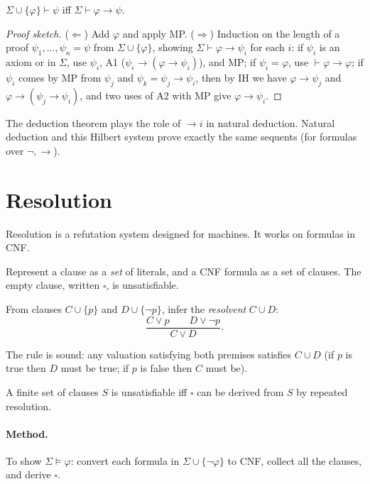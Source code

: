 \begin{theorem}
$\Sigma\cup\{\varphi\}\vdash\psi$ iff $\Sigma\vdash\varphi\to\psi$.
\end{theorem}
\begin{proof}[Proof sketch]
($\Leftarrow$) Add $\varphi$ and apply MP. ($\Rightarrow$) Induction on the length of a
proof $\psi_1,\dots,\psi_n=\psi$ from $\Sigma\cup\{\varphi\}$, showing
$\Sigma\vdash\varphi\to\psi_i$ for each $i$:
if $\psi_i$ is an axiom or in $\Sigma$, use $\psi_i$, A1 ($\psi_i\to(\varphi\to\psi_i)$),
and MP; if $\psi_i=\varphi$, use $\vdash\varphi\to\varphi$; if $\psi_i$ comes by MP from
$\psi_j$ and $\psi_k=\psi_j\to\psi_i$, then by IH we have $\varphi\to\psi_j$ and
$\varphi\to(\psi_j\to\psi_i)$, and two uses of A2 with MP give $\varphi\to\psi_i$.
\end{proof}

The deduction theorem plays the role of $\to i$ in natural deduction. Natural deduction
and this Hilbert system prove exactly the same sequents (for formulas over $\neg,\to$).

\section{Resolution}

Resolution is a refutation system designed for machines. It works on formulas in CNF.

\begin{definition}
Represent a clause as a \emph{set} of literals, and a CNF formula as a set of clauses.
The empty clause, written $\square$, is unsatisfiable.
\end{definition}

\begin{definition}
From clauses $C\cup\{p\}$ and $D\cup\{\neg p\}$, infer the \emph{resolvent} $C\cup D$:
\[
\dfrac{C\lor p\qquad D\lor\neg p}{C\lor D}.
\]
\end{definition}

The rule is sound: any valuation satisfying both premises satisfies $C\cup D$ (if $p$ is
true then $D$ must be true; if $p$ is false then $C$ must be).

\begin{theorem}
A finite set of clauses $S$ is unsatisfiable iff $\square$ can be derived from $S$ by
repeated resolution.
\end{theorem}

\paragraph{Method.} To show $\Sigma\models\varphi$: convert each formula in
$\Sigma\cup\{\neg\varphi\}$ to CNF, collect all the clauses, and derive $\square$.

